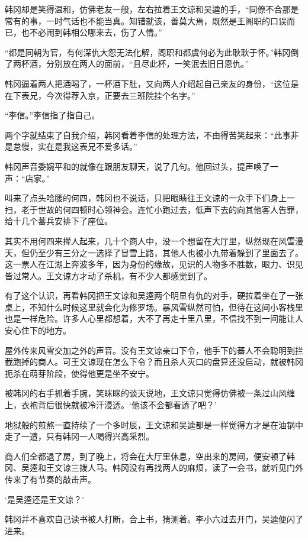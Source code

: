 韩冈却是笑得温和，仿佛老友一般，左右拉着王文谅和吴逵的手，“同僚不合那是常有的事，一时气话也不能当真。知错就该，善莫大焉，既然是王阁职的口误而已，也不必闹到韩相公哪来去，伤了人情。”

“都是同朝为官，有何深仇大怨无法化解，阁职和都虞何必为此耿耿于怀。”韩冈倒了两杯酒，分别放在两人的面前，“且尽此杯，一笑泯去旧日恩仇。”

韩冈逼着两人把酒喝了，一杯酒下肚，又向两人介绍起自己亲友的身份，“这位是在下表兄，今次得荐入京，正要去三班院挂个名字。”

“李信。”李信指了指自己。

两个字就结束了自我介绍，韩冈看着李信的处理方法，不由得苦笑起来：“此事非是怠慢，实在是我这表兄不爱多话。”

韩冈声音委婉平和的就像在跟朋友聊天，说了几句。他回过头，提声唤了一声：“店家。”

叫来了点头哈腰的何四，韩冈也不说话，只把眼睛往王文谅的一众手下们身上一扫，老于世故的何四顿时心领神会。连忙小跑过去，低声下去的向其他客人告罪，给十几个蕃兵安排下了座位。

其实不用何四来撵人起来，几十个商人中，没一个想留在大厅里，纵然现在风雪漫天，但仍至少有三分之一选择了冒雪上路，其他人也被小九带着躲到了里面去了。这一票人在江湖上奔波多年，因为身份的缘故，见识的人物多不胜数，眼力、识见皆过常人。王文谅方才动了杀机，有不少人都感觉到了。

有了这个认识，再看韩冈把王文谅和吴逵两个明显有仇的对手，硬拉着坐在了一张桌上，不知什么时候这里就会化为修罗场。暴风雪纵然可怕，但待在这间小客栈里也是一样危险。许多人心里都想着，大不了再走十里八里，不信找不到一间能让人安心住下的地方。

屋外传来风雪交加之外的声音。没有王文谅亲口下令，他手下的蕃人不会聪明到拦截跑掉的商人。可王文谅现在怎么下令？而且杀人灭口的盘算还没启动，就被韩冈扼杀在萌芽阶段，使得他更是坐不安宁。

被韩冈的右手抓着手腕，笑眯眯的谈天说地，王文谅只觉得仿佛被一条过山风缠上，衣袍背后很快就被冷汗浸透。‘他该不会都看透了吧？’

地狱般的煎熬一直持续了一个多时辰，王文谅和吴逵都是一样觉得方才是在油锅中走了一遭，只有韩冈一人喝得兴高采烈。

商人们全都退了房，到了晚上，将会在大厅里休息，空出来的房间，便安顿了韩冈、吴逵和王文谅三拨人马。韩冈没有再找两人的麻烦，读了一会书，就听见门外传来了有节奏的敲击声。

‘是吴逵还是王文谅？’

韩冈并不喜欢自己读书被人打断，合上书，猜测着。李小六过去开门，吴逵便闪了进来。

